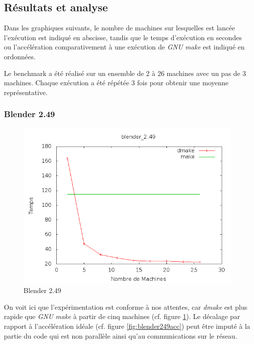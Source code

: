 \documentclass[a4paper,12pt,twoside]{article}
\begin{document}
\subsection{Résultats et analyse}

Dans les graphiques suivants, le nombre de machines sur lesquelles est
lancée l'exécution est indiqué en abscisse, tandis que le temps
d'exécution en secondes ou l'accélération comparativement à une
exécution de \emph{GNU make} est indiqué en ordonnées.

Le benchmark a été réalisé sur un ensemble de 2 à 26 machines avec un pas de 3 machines. Chaque
exécution a été répétée 3 fois pour obtenir une moyenne
représentative.


\subsubsection{Blender 2.49}


\begin{figure}[h]
  \centering
  \includegraphics[scale=0.5]{graph_blender_2_49.png}
  \caption{Blender 2.49}
  \label{fig:blender249}
\end{figure}

On voit ici que l'expérimentation est conforme à nos attentes, car \emph{dmake} est plus rapide que \emph{GNU make} à  partir de cinq machines (cf. figure \ref{fig:blender249}). Le décalage par rapport à l'accélération idéale (cf. figure \ref{fig:blender249acc}) peut
être imputé à la partie du code qui est non parallèle ainsi qu'au communications sur le réseau. 
\end{document}
